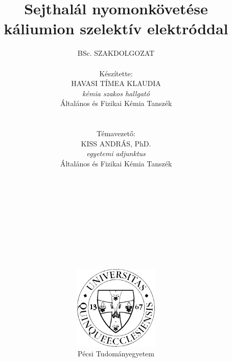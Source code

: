 \pagestyle{empty}

\title{\textbf{Sejthalál nyomonkövetése káliumion szelektív elektróddal}}

\author{BSc. SZAKDOLGOZAT\\
\\ Készítette:\\ 
HAVASI TÍMEA KLAUDIA \\
\emph{kémia szakos hallgató}\\
Általános és Fizikai Kémia Tanszék \\
\\ \\
Témavezető: \\
KISS ANDRÁS, PhD. \\
\emph{egyetemi adjunktus} \\
Általános és Fizikai Kémia Tanszék \\
\\ \\ \\ \\ \\ \\ \\ \\ \\ \\
\includegraphics[width=0.3\textwidth]{img/pte_logo.eps} \\ Pécsi Tudományegyetem}

\maketitle
\pagestyle{plain}

\large
\setcounter{tocdepth}{4}
\tableofcontents
